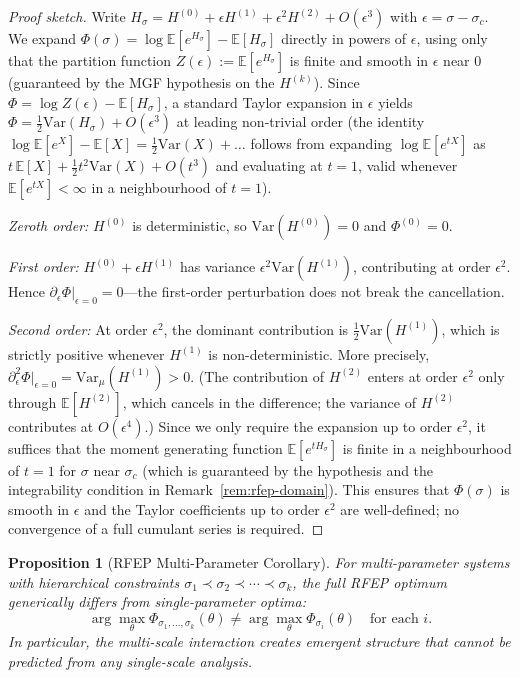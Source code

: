 \documentclass[12pt,a4paper]{article}
\newtheorem{proposition}[theorem]{Proposition}
\theoremstyle{definition}
\theoremstyle{remark}
\newcommand{\EE}{\mathbb{E}}
\begin{document}
\begin{proof}[Proof sketch]
Write $H_\sigma = H^{(0)} + \epsilon H^{(1)} + \epsilon^2 H^{(2)} + O(\epsilon^3)$ with $\epsilon = \sigma - \sigma_c$. We expand $\Phi(\sigma) = \log \EE[e^{H_\sigma}] - \EE[H_\sigma]$ directly in powers of $\epsilon$, using only that the partition function $Z(\epsilon) := \EE[e^{H_\sigma}]$ is finite and smooth in $\epsilon$ near $0$ (guaranteed by the MGF hypothesis on the $H^{(k)}$). Since $\Phi = \log Z(\epsilon) - \EE[H_\sigma]$, a standard Taylor expansion in $\epsilon$ yields $\Phi = \tfrac{1}{2}\mathrm{Var}(H_\sigma) + O(\epsilon^3)$ at leading non-trivial order (the identity $\log \EE[e^X] - \EE[X] = \tfrac{1}{2}\mathrm{Var}(X) + \ldots$ follows from expanding $\log \EE[e^{tX}]$ as $t\,\EE[X] + \tfrac{1}{2}t^2\mathrm{Var}(X) + O(t^3)$ and evaluating at $t=1$, valid whenever $\EE[e^{tX}] < \infty$ in a neighbourhood of $t=1$).

\smallskip\noindent
\emph{Zeroth order:} $H^{(0)}$ is deterministic, so $\mathrm{Var}(H^{(0)}) = 0$ and $\Phi^{(0)} = 0$.

\smallskip\noindent
\emph{First order:} $H^{(0)} + \epsilon H^{(1)}$ has variance $\epsilon^2 \mathrm{Var}(H^{(1)})$, contributing at order $\epsilon^2$. Hence $\partial_\epsilon \Phi|_{\epsilon = 0} = 0$---the first-order perturbation does not break the cancellation.

\smallskip\noindent
\emph{Second order:} At order $\epsilon^2$, the dominant contribution is $\tfrac{1}{2}\mathrm{Var}(H^{(1)})$, which is strictly positive whenever $H^{(1)}$ is non-deterministic. More precisely, $\partial^2_\epsilon \Phi|_{\epsilon=0} = \mathrm{Var}_\mu(H^{(1)}) > 0$. (The contribution of $H^{(2)}$ enters at order $\epsilon^2$ only through $\EE[H^{(2)}]$, which cancels in the difference; the variance of $H^{(2)}$ contributes at $O(\epsilon^4)$.) Since we only require the expansion up to order $\epsilon^2$, it suffices that the moment generating function $\EE[e^{tH_\sigma}]$ is finite in a neighbourhood of $t=1$ for $\sigma$ near $\sigma_c$ (which is guaranteed by the hypothesis and the integrability condition in Remark~\ref{rem:rfep-domain}). This ensures that $\Phi(\sigma)$ is smooth in $\epsilon$ and the Taylor coefficients up to order $\epsilon^2$ are well-defined; no convergence of a full cumulant series is required.
\end{proof}

\begin{proposition}[RFEP Multi-Parameter Corollary]
\label{prop:rfep-multi}
For multi-parameter systems with hierarchical constraints $\sigma_1 \prec \sigma_2 \prec \cdots \prec \sigma_k$, the full RFEP optimum generically differs from single-parameter optima:
\[
\arg\max_\theta \Phi_{\sigma_1, \ldots, \sigma_k}(\theta) \neq \arg\max_\theta \Phi_{\sigma_i}(\theta) \quad \text{for each } i.
\]
In particular, the multi-scale interaction creates emergent structure that cannot be predicted from any single-scale analysis.
\end{proposition}
\end{document}
